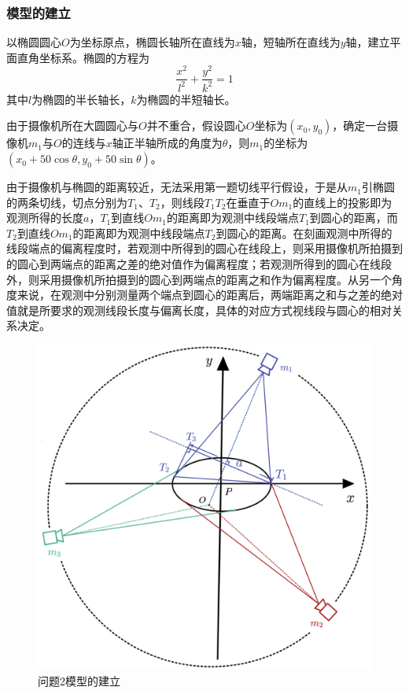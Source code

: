 \documentclass[a4paper,10.5pt]{ctexart}
\begin{document}
\subsubsection{模型的建立}
\par 以椭圆圆心$O$为坐标原点，椭圆长轴所在直线为$x$轴，短轴所在直线为$y$轴，建立平面直角坐标系。椭圆的方程为$$\frac{x^2}{l^2}+\frac{y^2}{k^2}=1$$其中$l$为椭圆的半长轴长，$k$为椭圆的半短轴长。
\par 由于摄像机所在大圆圆心与$O$并不重合，假设圆心$O$坐标为$(x_0,y_0)$，确定一台摄像机$m_1$与$O$的连线与$x$轴正半轴所成的角度为$\theta$，则$m_1$的坐标为$(x_0+50\cos\theta,y_0+50\sin\theta)$。
\par 由于摄像机与椭圆的距离较近，无法采用第一题切线平行假设，于是从$m_1$引椭圆的两条切线，切点分别为$T_1$、$T_2$，则线段$T_1T_2$在垂直于$Om_1$的直线上的投影即为观测所得的长度$a$，$T_1$到直线$Om_1$的距离即为观测中线段端点$T_1$到圆心的距离，而$T_2$到直线$Om_1$的距离即为观测中线段端点$T_2$到圆心的距离。在刻画观测中所得的线段端点的偏离程度时，若观测中所得到的圆心在线段上，则采用摄像机所拍摄到的圆心到两端点的距离之差的绝对值作为偏离程度；若观测所得到的圆心在线段外，则采用摄像机所拍摄到的圆心到两端点的距离之和作为偏离程度。从另一个角度来说，在观测中分别测量两个端点到圆心的距离后，两端距离之和与之差的绝对值就是所要求的观测线段长度与偏离长度，具体的对应方式视线段与圆心的相对关系决定。
\begin{figure}[h]%
\centering
\includegraphics[scale=0.17]{问题2建模.jpg}
\caption{问题2模型的建立}
\label{fig:label}
\end{figure}
\end{document}
